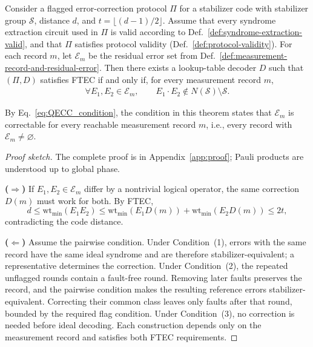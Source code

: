 \documentclass[acmsmall,screen,review,anonymous,nonacm]{acmart}
\newcommand{\cS}{\mathcal{S}}
\begin{document}
\begin{theorem}
\label{thm:mains}
Consider a flagged error-correction protocol $\Pi$ for a stabilizer
code with stabilizer group $\cS$, distance $d$, and
$t=\lfloor (d-1)/2 \rfloor$. Assume that every syndrome extraction
circuit used in $\Pi$ is valid according to
Def.~\ref{def:syndrome-extraction-valid}, and that $\Pi$ satisfies
protocol validity (Def.~\ref{def:protocol-validity}).
For each record $m$, let $\mathcal E_m$ be the residual error set
from Def.~\ref{def:measurement-record-and-residual-error}.
Then there exists a lookup-table decoder $D$ such that $(\Pi,D)$
satisfies FTEC if and only if, for every measurement record $m$,
\begin{align}
    \forall E_1,E_2\in\mathcal{E}_m,\qquad
    E_1\cdot  E_2\notin N(\cS)\setminus \cS.
\end{align}
\end{theorem}

By Eq.~\ref{eq:QECC_condition}, the condition in this theorem states
that $\mathcal E_m$ is correctable for every reachable measurement
record $m$, i.e., every record with $\mathcal E_m\neq\varnothing$.

\begin{proof}[Proof sketch]
The complete proof is in Appendix~\ref{app:proof}; Pauli products are
understood up to global phase.

\textbf{($\Rightarrow$)}
If $E_1,E_2\in\mathcal E_m$ differ by a nontrivial logical operator,
the same correction $D(m)$ must work for both. By FTEC,
\[
d\le\mathrm{wt}_{\min}(E_1E_2)
\le\mathrm{wt}_{\min}(E_1D(m))
 +\mathrm{wt}_{\min}(E_2D(m))
\le 2t,
\]
contradicting the code distance.

\textbf{($\Leftarrow$)}
Assume the pairwise condition. Under Condition~(1), errors with
the same record have the same ideal syndrome and are therefore
stabilizer-equivalent; a representative determines the correction.
Under Condition~(2), the repeated unflagged rounds contain a
fault-free round. Removing later faults preserves the record,
and the pairwise condition makes the resulting reference errors
stabilizer-equivalent. Correcting their common class leaves only
faults after that round, bounded by the required flag condition.
Under Condition~(3), no correction is needed before ideal decoding.
Each construction depends only on the measurement record and
satisfies both FTEC requirements.
\end{proof}
\end{document}
